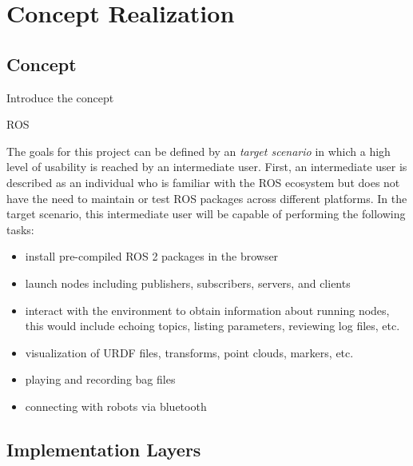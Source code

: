 \chapter{Concept Realization}\label{cha:concept}


\section{Concept}\label{sec:concept}



    Introduce the concept

    \ac{ROS}



    The goals for this project can be defined by an \textit{target scenario} in 
    which a high level of usability is reached by an intermediate user. First, an
    intermediate user is described as an individual who is familiar with the 
    \ac{ROS} ecosystem but does not have the need to maintain or test \ac{ROS} packages
    across different platforms. In the target scenario, this intermediate
    user will be capable of performing the following tasks:

    \begin{itemize}
        \item install pre-compiled ROS 2 packages in the browser
        \item launch nodes including publishers, subscribers, servers, and clients
        \item interact with the environment to obtain information about 
                running nodes, this would include echoing topics, listing 
                parameters, reviewing log files, etc.
        \item visualization of \ac{URDF} files, transforms, point clouds, markers, etc.
        \item playing and recording bag files %
        \item connecting with robots via bluetooth
    \end{itemize}




\section{Implementation Layers}

